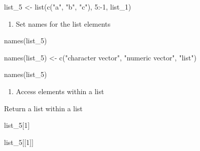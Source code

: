 \documentclass[
  letterpaper,
  DIV=11,
  numbers=noendperiod]{scrreprt}
\newenvironment{Shaded}{}{}
\newcommand{\DecValTok}[1]{\textcolor[rgb]{0.00,0.36,0.77}{#1}}
\newcommand{\FunctionTok}[1]{\textcolor[rgb]{0.44,0.26,0.76}{#1}}
\newcommand{\NormalTok}[1]{\textcolor[rgb]{0.14,0.16,0.18}{#1}}
\newcommand{\OtherTok}[1]{\textcolor[rgb]{0.44,0.26,0.76}{#1}}
\newcommand{\SpecialCharTok}[1]{\textcolor[rgb]{0.00,0.36,0.77}{#1}}
\newcommand{\StringTok}[1]{\textcolor[rgb]{0.01,0.18,0.38}{#1}}
\providecommand{\tightlist}{%
  \setlength{\itemsep}{0pt}\setlength{\parskip}{0pt}}\usepackage{longtable,booktabs,array}
\begin{document}
\begin{Shaded}
\begin{Highlighting}[]
\NormalTok{list\_5 }\OtherTok{\textless{}{-}} \FunctionTok{list}\NormalTok{(}\FunctionTok{c}\NormalTok{(}\StringTok{"a"}\NormalTok{, }\StringTok{"b"}\NormalTok{, }\StringTok{"c"}\NormalTok{), }\DecValTok{5}\SpecialCharTok{:{-}}\DecValTok{1}\NormalTok{, list\_1)}
\end{Highlighting}
\end{Shaded}

\begin{enumerate}
\def\labelenumi{\alph{enumi}.}
\setcounter{enumi}{5}
\tightlist
\item
  Set names for the list elements
\end{enumerate}

\begin{Shaded}
\begin{Highlighting}[]
\FunctionTok{names}\NormalTok{(list\_5)}
\end{Highlighting}
\end{Shaded}

\begin{Shaded}
\begin{Highlighting}[]
\FunctionTok{names}\NormalTok{(list\_5) }\OtherTok{\textless{}{-}} \FunctionTok{c}\NormalTok{(}\StringTok{"character vector"}\NormalTok{, }\StringTok{"numeric vector"}\NormalTok{, }\StringTok{"list"}\NormalTok{)}
\end{Highlighting}
\end{Shaded}

\begin{Shaded}
\begin{Highlighting}[]
\FunctionTok{names}\NormalTok{(list\_5)}
\end{Highlighting}
\end{Shaded}

\begin{enumerate}
\def\labelenumi{\alph{enumi}.}
\setcounter{enumi}{6}
\tightlist
\item
  Access elements within a list
\end{enumerate}

Return a list within a list

\begin{Shaded}
\begin{Highlighting}[]
\NormalTok{list\_5[}\DecValTok{1}\NormalTok{]}

\NormalTok{list\_5[[}\DecValTok{1}\NormalTok{]]}
\end{Highlighting}
\end{Shaded}
\end{document}
